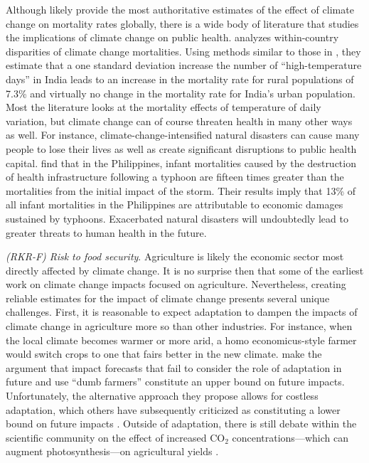 Although \cite{carleton2022valuing} likely provide the most authoritative estimates of the effect of climate change on mortality rates globally, there is a wide body of literature that studies the implications of climate change on public health. \cite{deschenes2011climate} analyzes within-country disparities of climate change mortalities. Using methods similar to those in \cite{carleton2022valuing}, they estimate that a one standard deviation increase the number of ``high-temperature days'' in India leads to an increase in the mortality rate for rural populations of 7.3\% and virtually no change in the mortality rate for India's urban population. Most the literature looks at the mortality effects of temperature of daily variation, but climate change can of course threaten health in many other ways as well. For instance, climate-change-intensified natural disasters can cause many people to lose their lives as well as create significant disruptions to public health capital. \cite{anttila2013destruction} find that in the Philippines, infant mortalities caused by the destruction of health infrastructure following a typhoon are fifteen times greater than the mortalities from the initial impact of the storm. Their results imply that 13\% of all infant mortalities in the Philippines are attributable to economic damages sustained by typhoons. Exacerbated natural disasters will undoubtedly lead to greater threats to human health in the future.


\textit{(RKR-F) Risk to food security}. Agriculture is likely the economic sector most directly affected by climate change. It is no surprise then that some of the earliest work on climate change impacts focused on agriculture. 
Nevertheless, creating reliable estimates for the impact of climate change presents several unique challenges. First, it is reasonable to expect adaptation to dampen the impacts of climate change in agriculture more so than other industries. For instance, when the local climate becomes warmer or more arid, a homo economicus-style farmer would switch crops to one that fairs better in the new climate. \cite{mendelsohn1994impact} make the argument that impact forecasts that fail to consider the role of adaptation in future and use ``dumb farmers''  constitute an upper bound on future impacts. Unfortunately, the alternative approach they propose allows for costless adaptation, which others have subsequently criticized as constituting a lower bound on future impacts \citep{quiggin1999impact}. Outside of adaptation, there is still debate within the scientific community on the effect of increased CO$_2$ concentrations---which can augment photosynthesis---on agricultural yields \citep{long2006food, hatfield2011climate, myers2017climate}. 

